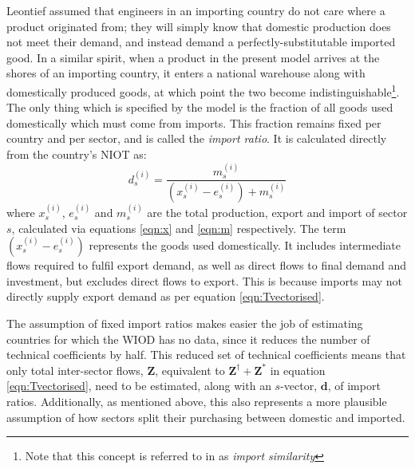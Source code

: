 \documentclass[a4paper]{article}
\begin{document}
Leontief assumed that engineers in an importing country do not care where a product originated from; they will simply know that domestic production does not meet their demand, and instead demand a perfectly-substitutable imported good.
In a similar spirit, when a product in the present model arrives at the shores of an importing country, it enters a national warehouse along with domestically produced goods, at which point the two become indistinguishable\footnote{Note that this concept is referred to in \textcite{Miller1985} as \textit{import similarity}}.
The only thing which is specified by the model is the fraction of all goods used domestically which must come from imports. This fraction remains fixed per country and per sector, and is called the \textit{import ratio}. It is calculated directly from the country's NIOT as:
\begin{equation}\label{eqn:importratio}
d_s^{(i)} = \frac{m_s^{(i)}}{(x_s^{(i)} - e_s^{(i)} ) + m_s^{(i)}}
\end{equation}
where $x_s^{(i)}$, $e_s^{(i)}$ and $m_s^{(i)}$ are the total production, export and import of sector $s$, calculated via equations \eqref{eqn:x} and \eqref{eqn:m} respectively.
The term $(x_s^{(i)} - e_s^{(i)} )$ represents the goods used domestically.
It includes intermediate flows required to fulfil export demand, as well as direct flows to final demand and investment, but excludes direct flows to export.
This is because imports may not directly supply export demand as per equation \eqref{eqn:Tvectorised}.

The assumption of fixed import ratios makes easier the job of estimating countries for which the WIOD has no data, since it reduces the number of technical coefficients by half.
This reduced set of technical coefficients means that only total inter-sector flows, $\boldsymbol{Z}$, equivalent to $\boldsymbol{Z}^{\dagger} + \boldsymbol{Z}^{*}$ in equation \eqref{eqn:Tvectorised}, need to be estimated, along with an $s$-vector, $\boldsymbol{d}$, of import ratios.
Additionally, as mentioned above, this also represents a more plausible assumption of how sectors split their purchasing between domestic and imported.
\end{document}
